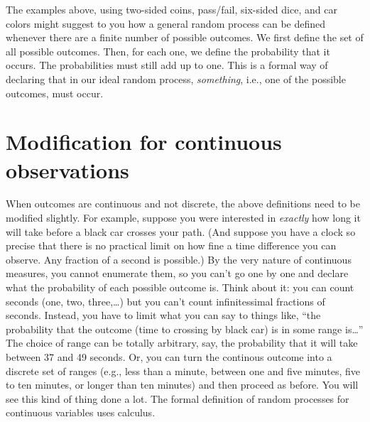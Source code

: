 \documentclass[openany]{book}
\begin{document}
The examples above, using two-sided coins, pass/fail, six-sided dice, and car colors might suggest to you how a general random process can be defined whenever there are a finite number of possible outcomes. We first define the set of all possible outcomes. Then, for each one, we define the probability that it occurs. The probabilities must still add up to one. This is a formal way of declaring that in our ideal random process, \emph{something}, i.e., one of the possible outcomes, must occur.

\hypertarget{modification-for-continuous-observations}{%
\section{Modification for continuous observations}\label{modification-for-continuous-observations}}

When outcomes are continuous and not discrete, the above definitions need to be modified slightly. For example, suppose you were interested in \emph{exactly} how long it will take before a black car crosses your path. (And suppose you have a clock so precise that there is no practical limit on how fine a time difference you can observe. Any fraction of a second is possible.) By the very nature of continuous measures, you cannot enumerate them, so you can't go one by one and declare what the probability of each possible outcome is. Think about it: you can count seconds (one, two, three,\ldots{}) but you can't count infinitessimal fractions of seconds. Instead, you have to limit what you can say to things like, ``the probability that the outcome (time to crossing by black car) is in some range is\ldots{}'' The choice of range can be totally arbitrary, say, the probability that it will take between 37 and 49 seconds. Or, you can turn the continous outcome into a discrete set of ranges (e.g., less than a minute, between one and five minutes, five to ten minutes, or longer than ten minutes) and then proceed as before. You will see this kind of thing done a lot. The formal definition of random processes for continuous variables uses calculus.


\end{document}
